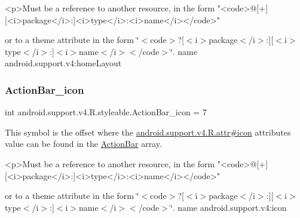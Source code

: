 \begin{DoxyVerb}      <p>Must be a reference to another resource, in the form "<code>@[+][<i>package</i>:]<i>type</i>:<i>name</i></code>"
\end{DoxyVerb}
 or to a theme attribute in the form \char`\"{}$<$code$>$?\mbox{[}$<$i$>$package$<$/i$>$\+:\mbox{]}\mbox{[}$<$i$>$type$<$/i$>$\+:\mbox{]}$<$i$>$name$<$/i$>$$<$/code$>$\char`\"{}.  name android.\+support.\+v4\+:home\+Layout \mbox{\label{classandroid_1_1support_1_1v4_1_1R_1_1styleable_aaa9149c39fa694d73adbfce1bf7a2147}} 
\subsubsection{\texorpdfstring{Action\+Bar\+\_\+icon}{ActionBar\_icon}}
{\footnotesize\ttfamily int android.\+support.\+v4.\+R.\+styleable.\+Action\+Bar\+\_\+icon = 7\hspace{0.3cm}{\ttfamily [static]}}

This symbol is the offset where the \hyperlink{classandroid_1_1support_1_1v4_1_1R_1_1attr_a8b36ffbef72c995a962ef0ca3d414c7e}{android.\+support.\+v4.\+R.\+attr\#icon} attribute\textquotesingle{}s value can be found in the \hyperlink{classandroid_1_1support_1_1v4_1_1R_1_1styleable_adc5a3492b9c46265760d7120a04d6afa}{Action\+Bar} array.

\begin{DoxyVerb}      <p>Must be a reference to another resource, in the form "<code>@[+][<i>package</i>:]<i>type</i>:<i>name</i></code>"
\end{DoxyVerb}
 or to a theme attribute in the form \char`\"{}$<$code$>$?\mbox{[}$<$i$>$package$<$/i$>$\+:\mbox{]}\mbox{[}$<$i$>$type$<$/i$>$\+:\mbox{]}$<$i$>$name$<$/i$>$$<$/code$>$\char`\"{}.  name android.\+support.\+v4\+:icon \mbox{\label{classandroid_1_1support_1_1v4_1_1R_1_1styleable_a044b37dfc919ff9fb71d66587fe8f559}} 

